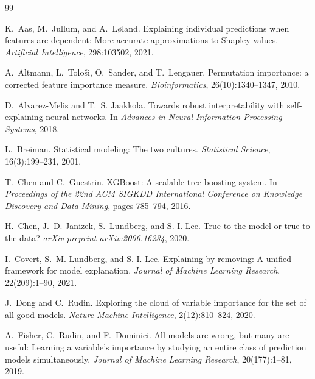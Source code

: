 \documentclass[11pt]{article}
\begin{document}
\begin{thebibliography}{99}

K.~Aas, M.~Jullum, and A.~L{\o}land.
\newblock Explaining individual predictions when features are dependent:
  More accurate approximations to {S}hapley values.
\newblock \emph{Artificial Intelligence}, 298:103502, 2021.

A.~Altmann, L.~Tolo{\v{s}}i, O.~Sander, and T.~Lengauer.
\newblock Permutation importance: a corrected feature importance measure.
\newblock \emph{Bioinformatics}, 26(10):1340--1347, 2010.

D.~Alvarez-Melis and T.~S. Jaakkola.
\newblock Towards robust interpretability with self-explaining neural networks.
\newblock In \emph{Advances in Neural Information Processing Systems}, 2018.

L.~Breiman.
\newblock Statistical modeling: The two cultures.
\newblock \emph{Statistical Science}, 16(3):199--231, 2001.

T.~Chen and C.~Guestrin.
\newblock XGBoost: A scalable tree boosting system.
\newblock In \emph{Proceedings of the 22nd ACM SIGKDD International Conference
  on Knowledge Discovery and Data Mining}, pages 785--794, 2016.

H.~Chen, J.~D. Janizek, S.~Lundberg, and S.-I. Lee.
\newblock True to the model or true to the data?
\newblock \emph{arXiv preprint arXiv:2006.16234}, 2020.

I.~Covert, S.~M. Lundberg, and S.-I. Lee.
\newblock Explaining by removing: A unified framework for model explanation.
\newblock \emph{Journal of Machine Learning Research}, 22(209):1--90, 2021.

J.~Dong and C.~Rudin.
\newblock Exploring the cloud of variable importance for the set of all good
  models.
\newblock \emph{Nature Machine Intelligence}, 2(12):810--824, 2020.

A.~Fisher, C.~Rudin, and F.~Dominici.
\newblock All models are wrong, but many are useful: Learning a variable's
  importance by studying an entire class of prediction models simultaneously.
\newblock \emph{Journal of Machine Learning Research}, 20(177):1--81, 2019.


\end{thebibliography}
\end{document}

